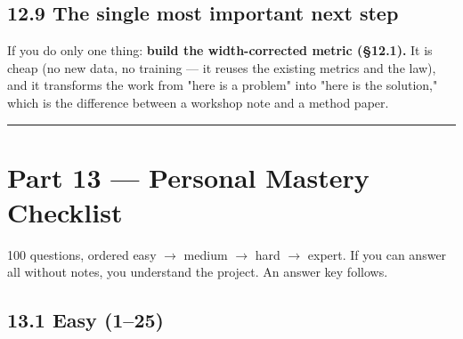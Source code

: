 \documentclass[11pt]{article}
\begin{document}
\subsection*{12.9 The single most important next step}

If you do only one thing: \textbf{build the width-corrected metric (\S{}12.1).} It is cheap (no new data, no training --- it reuses the existing metrics and the law), and it transforms the work from "here is a problem" into "here is the solution," which is the difference between a workshop note and a method paper.

\vspace{3pt}\hrule\vspace{3pt}
\clearpage\section*{Part 13 --- Personal Mastery Checklist}

100 questions, ordered easy $\rightarrow$ medium $\rightarrow$ hard $\rightarrow$ expert. If you can answer all without notes, you understand the project. An answer key follows.

\subsection*{13.1 Easy (1--25)}
\end{document}
